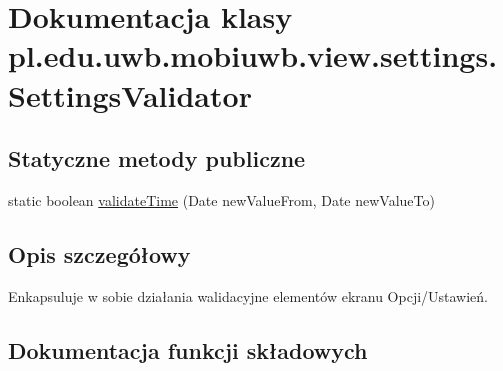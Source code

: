 \hypertarget{classpl_1_1edu_1_1uwb_1_1mobiuwb_1_1view_1_1settings_1_1_settings_validator}{}\section{Dokumentacja klasy pl.\+edu.\+uwb.\+mobiuwb.\+view.\+settings.\+Settings\+Validator}
\label{classpl_1_1edu_1_1uwb_1_1mobiuwb_1_1view_1_1settings_1_1_settings_validator}
\subsection*{Statyczne metody publiczne}
\begin{DoxyCompactItemize}
\item 
static boolean \hyperlink{classpl_1_1edu_1_1uwb_1_1mobiuwb_1_1view_1_1settings_1_1_settings_validator_a3d831fc1f7c5c8f826f84d121665cda3}{validate\+Time} (Date new\+Value\+From, Date new\+Value\+To)
\end{DoxyCompactItemize}


\subsection{Opis szczegółowy}
Enkapsuluje w sobie działania walidacyjne elementów ekranu Opcji/\+Ustawień. 

\subsection{Dokumentacja funkcji składowych}
\hypertarget{classpl_1_1edu_1_1uwb_1_1mobiuwb_1_1view_1_1settings_1_1_settings_validator_a3d831fc1f7c5c8f826f84d121665cda3}{}
